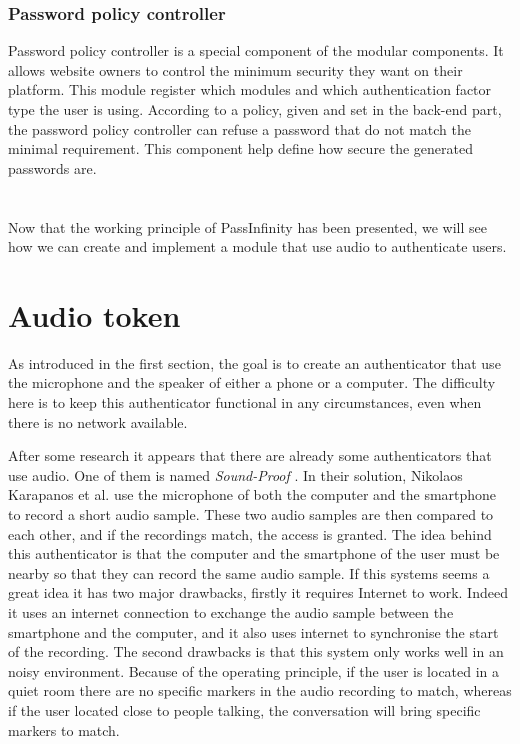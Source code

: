 \documentclass[twocolumn,14pt]{extarticle}
\begin{document}
\subsubsection{Password policy controller}

Password policy controller is a special component of the modular components. It allows website owners to control the minimum security they want on their platform. This module register which modules and which authentication factor type the user is using. According to a policy, given and set in the back-end part, the password policy controller can refuse a password that do not match the minimal requirement. This component help define how secure the generated passwords are. 
\\
\\
\\
Now that the working principle of PassInfinity has been presented, we will see how we can create and implement a module that use audio to authenticate users.

\section{Audio token}
\label{sec:audiotoken}
As introduced in the first section, the goal is to create an authenticator that use the microphone and the speaker of either a phone or a computer. The difficulty here is to keep this authenticator functional in any circumstances, even when there is no network available.

After some research it appears that there are already some authenticators that use audio. One of them is named \textit{Sound-Proof} \cite{sound_proof}. In their solution, Nikolaos Karapanos et al. use the microphone of both the computer and the smartphone to record a short audio sample. These two audio samples are then compared to each other, and if the recordings match, the access is granted. The idea behind this authenticator is that the computer and the smartphone of the user must be nearby so that they can record the same audio sample. If this systems seems a great idea it has two major drawbacks, firstly it requires Internet to work. Indeed it uses an internet connection to exchange the audio sample between the smartphone and the computer, and it also uses internet to synchronise the start of the recording. The second drawbacks is that this system only works well in an noisy environment. Because of the operating principle, if the user is located in a quiet room there are no specific markers in the audio recording to match, whereas if the user located close to people talking, the conversation will bring specific markers to match.
\end{document}

